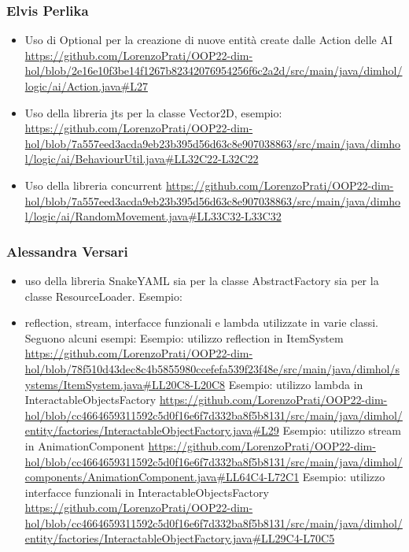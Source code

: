 \documentclass[a4paper,12pt]{report}
\begin{document}
\subsubsection*{Elvis Perlika}
\begin{itemize}
	\item Uso di Optional per la creazione di nuove entità create dalle Action delle AI \url{https://github.com/LorenzoPrati/OOP22-dim-hol/blob/2e16e10f3be14f1267b82342076954256f6c2a2d/src/main/java/dimhol/logic/ai/Action.java#L27}
	
	\item Uso della libreria jts per la classe Vector2D, esempio: \url{https://github.com/LorenzoPrati/OOP22-dim-hol/blob/7a557eed3acda9eb23b395d56d63c8e907038863/src/main/java/dimhol/logic/ai/BehaviourUtil.java#LL32C22-L32C22}

	\item Uso della libreria concurrent \url{https://github.com/LorenzoPrati/OOP22-dim-hol/blob/7a557eed3acda9eb23b395d56d63c8e907038863/src/main/java/dimhol/logic/ai/RandomMovement.java#LL33C32-L33C32}

\end{itemize}

\subsubsection*{Alessandra Versari}
\begin{itemize}
	\item uso della libreria SnakeYAML sia per la classe AbstractFactory sia per la classe ResourceLoader.
	Esempio: \url{}
	\item reflection, stream, interfacce funzionali e lambda utilizzate in varie classi. Seguono alcuni esempi:
	Esempio: utilizzo reflection in ItemSystem \url{https://github.com/LorenzoPrati/OOP22-dim-hol/blob/78f510d43dec8c4b5855980ccefefa539f23f48e/src/main/java/dimhol/systems/ItemSystem.java#LL20C8-L20C8}
	Esempio: utilizzo lambda in InteractableObjectsFactory \url{https://github.com/LorenzoPrati/OOP22-dim-hol/blob/cc4664659311592c5d0f16e6f7d332ba8f5b8131/src/main/java/dimhol/entity/factories/InteractableObjectFactory.java#L29}
	Esempio: utilizzo stream in AnimationComponent \url{https://github.com/LorenzoPrati/OOP22-dim-hol/blob/cc4664659311592c5d0f16e6f7d332ba8f5b8131/src/main/java/dimhol/components/AnimationComponent.java#LL64C4-L72C1}
	Esempio: utilizzo interfacce funzionali in InteractableObjectsFactory \url{https://github.com/LorenzoPrati/OOP22-dim-hol/blob/cc4664659311592c5d0f16e6f7d332ba8f5b8131/src/main/java/dimhol/entity/factories/InteractableObjectFactory.java#LL29C4-L70C5}
\end{itemize}
\end{document}
